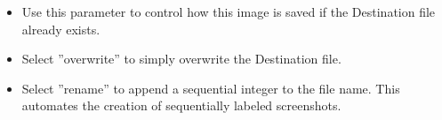 \begin{itemize}
\item Use this parameter to control how this image is saved if the Destination file already exists.
\item Select ''overwrite'' to simply overwrite the Destination file.
\item Select ''rename'' to append a sequential integer to the file name. This automates the creation of sequentially labeled screenshots.
\end{itemize}
